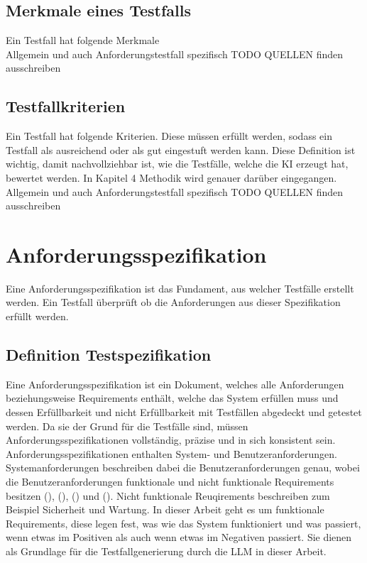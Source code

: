 \documentclass[12pt,toc=bib,toc=listof]{scrreprt}
\begin{document}
\subsection{Merkmale eines Testfalls} %
\label{sec:merkmaleEinesTestfalls}
Ein Testfall hat folgende Merkmale\\
Allgemein und auch Anforderungstestfall spezifisch
TODO QUELLEN finden ausschreiben

\subsection{Testfallkriterien} %
\label{sec:testfallkriterien}
Ein Testfall hat folgende Kriterien. Diese müssen erfüllt werden, sodass ein Testfall als ausreichend oder als gut eingestuft werden kann. Diese Definition ist wichtig, damit nachvollziehbar ist, wie die Testfälle, welche die KI erzeugt hat, bewertet werden. In Kapitel 4 Methodik wird genauer darüber eingegangen.\\
Allgemein und auch Anforderungstestfall spezifisch
TODO QUELLEN finden ausschreiben

\section{Anforderungsspezifikation} %
\label{sec:anforderungsspezifikation}
Eine Anforderungsspezifikation  ist das Fundament, aus welcher Testfälle erstellt werden. Ein Testfall überprüft ob die Anforderungen aus dieser Spezifikation erfüllt werden.

\subsection{Definition Testspezifikation} %
\label{sec:definitionTestspezifikation}
Eine Anforderungsspezifikation ist ein Dokument, welches alle Anforderungen beziehungsweise Requirements enthält, welche das System erfüllen muss und dessen Erfüllbarkeit und nicht Erfüllbarkeit mit Testfällen abgedeckt und getestet werden. Da sie der Grund für die Testfälle sind, müssen Anforderungsspezifikationen vollständig, präzise und in sich konsistent sein. Anforderungsspezifikationen enthalten System- und Benutzeranforderungen. Systemanforderungen beschreiben dabei die Benutzeranforderungen genau, wobei die Benutzeranforderungen funktionale und nicht funktionale Requirements besitzen (\cite{Aysolmaz2018}), (\cite{Barmi2011}), (\cite{Mustafa2021}) und (\cite{Visure2024}). Nicht funktionale Reuqirements beschreiben zum Beispiel Sicherheit und Wartung. In dieser Arbeit geht es um funktionale Requirements, diese legen fest, was wie das System funktioniert und was passiert, wenn etwas im Positiven als auch wenn etwas im Negativen passiert. Sie dienen als Grundlage für die Testfallgenerierung durch die LLM in dieser Arbeit.
\end{document}
